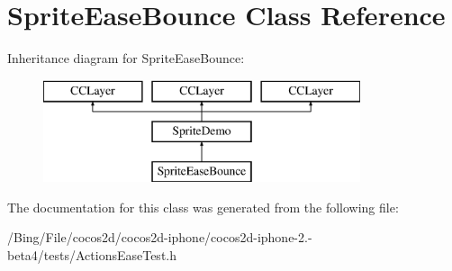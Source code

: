 \hypertarget{interface_sprite_ease_bounce}{\section{Sprite\-Ease\-Bounce Class Reference}
\label{interface_sprite_ease_bounce}
}
Inheritance diagram for Sprite\-Ease\-Bounce\-:\begin{figure}[H]
\begin{center}
\leavevmode
\includegraphics[height=3.000000cm]{interface_sprite_ease_bounce}
\end{center}
\end{figure}


The documentation for this class was generated from the following file\-:\begin{DoxyCompactItemize}
\item 
/\-Bing/\-File/cocos2d/cocos2d-\/iphone/cocos2d-\/iphone-\/2.-\/beta4/tests/Actions\-Ease\-Test.\-h\end{DoxyCompactItemize}
